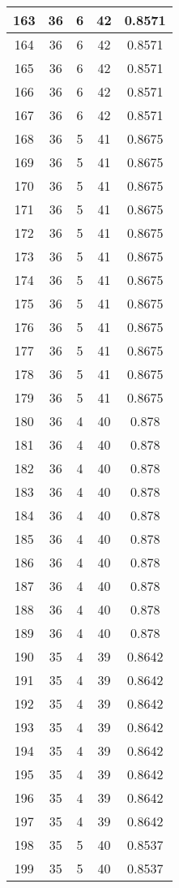 \documentclass[letterpaper, 12pt]{article}
\begin{document}
\begin{longtable}{|c|c|c|c|c|}
\hline
163 & 36 & 6 & 42 & 0.8571 \\
\hline
164 & 36 & 6 & 42 & 0.8571 \\
\hline
165 & 36 & 6 & 42 & 0.8571 \\
\hline
166 & 36 & 6 & 42 & 0.8571 \\
\hline
167 & 36 & 6 & 42 & 0.8571 \\
\hline
168 & 36 & 5 & 41 & 0.8675 \\
\hline
169 & 36 & 5 & 41 & 0.8675 \\
\hline
170 & 36 & 5 & 41 & 0.8675 \\
\hline
171 & 36 & 5 & 41 & 0.8675 \\
\hline
172 & 36 & 5 & 41 & 0.8675 \\
\hline
173 & 36 & 5 & 41 & 0.8675 \\
\hline
174 & 36 & 5 & 41 & 0.8675 \\
\hline
175 & 36 & 5 & 41 & 0.8675 \\
\hline
176 & 36 & 5 & 41 & 0.8675 \\
\hline
177 & 36 & 5 & 41 & 0.8675 \\
\hline
178 & 36 & 5 & 41 & 0.8675 \\
\hline
179 & 36 & 5 & 41 & 0.8675 \\
\hline
180 & 36 & 4 & 40 & 0.878 \\
\hline
181 & 36 & 4 & 40 & 0.878 \\
\hline
182 & 36 & 4 & 40 & 0.878 \\
\hline
183 & 36 & 4 & 40 & 0.878 \\
\hline
184 & 36 & 4 & 40 & 0.878 \\
\hline
185 & 36 & 4 & 40 & 0.878 \\
\hline
186 & 36 & 4 & 40 & 0.878 \\
\hline
187 & 36 & 4 & 40 & 0.878 \\
\hline
188 & 36 & 4 & 40 & 0.878 \\
\hline
189 & 36 & 4 & 40 & 0.878 \\
\hline
190 & 35 & 4 & 39 & 0.8642 \\
\hline
191 & 35 & 4 & 39 & 0.8642 \\
\hline
192 & 35 & 4 & 39 & 0.8642 \\
\hline
193 & 35 & 4 & 39 & 0.8642 \\
\hline
194 & 35 & 4 & 39 & 0.8642 \\
\hline
195 & 35 & 4 & 39 & 0.8642 \\
\hline
196 & 35 & 4 & 39 & 0.8642 \\
\hline
197 & 35 & 4 & 39 & 0.8642 \\
\hline
198 & 35 & 5 & 40 & 0.8537 \\
\hline
199 & 35 & 5 & 40 & 0.8537 \\
\hline
\end{longtable}
\end{document}

